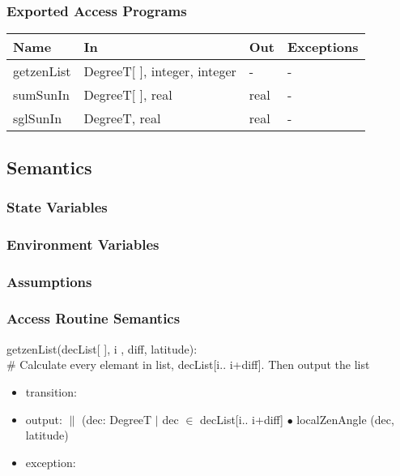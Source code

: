 \documentclass[12pt, titlepage]{article}
\begin{document}
\subsubsection{Exported Access Programs}

\begin{center}
\begin{tabular}{p{2cm} p{4cm} p{4cm} p{2cm}}
\hline
\textbf{Name} & \textbf{In} & \textbf{Out} & \textbf{Exceptions} \\
\hline
getzenList & DegreeT[ ], integer, integer & - & - \\
sumSunIn & DegreeT[ ], real & real & - \\
sglSunIn & DegreeT, real & real & - \\

\hline
\end{tabular}
\end{center}

\subsection{Semantics}

\subsubsection{State Variables}


\subsubsection{Environment Variables}


\subsubsection{Assumptions}


\subsubsection{Access Routine Semantics}

\noindent getzenList(decList[ ], i , diff, latitude):\\
$\#$ Calculate every elemant in list, decList[i.. i+diff]. Then output the list
\begin{itemize}
\item transition: 
\item output: $\|$ (dec: DegreeT $|$ dec $\in$ decList[i.. i+diff] $\bullet$ localZenAngle (dec, latitude)
\item exception: 
\end{itemize}
\end{document}
